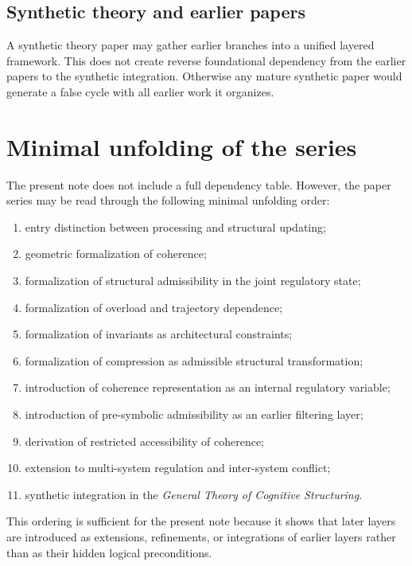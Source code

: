 \documentclass[11pt,a4paper]{article}
\begin{document}
	\subsection{Synthetic theory and earlier papers}
	
	A synthetic theory paper may gather earlier branches into a unified layered framework. This does
	not create reverse foundational dependency from the earlier papers to the synthetic integration.
	Otherwise any mature synthetic paper would generate a false cycle with all earlier work it organizes.
	
	\section{Minimal unfolding of the series}
	
	The present note does not include a full dependency table. However, the paper series may be read
	through the following minimal unfolding order:
	
	\begin{enumerate}[leftmargin=2em]
		\item entry distinction between processing and structural updating;
		\item geometric formalization of coherence;
		\item formalization of structural admissibility in the joint regulatory state;
		\item formalization of overload and trajectory dependence;
		\item formalization of invariants as architectural constraints;
		\item formalization of compression as admissible structural transformation;
		\item introduction of coherence representation as an internal regulatory variable;
		\item introduction of pre-symbolic admissibility as an earlier filtering layer;
		\item derivation of restricted accessibility of coherence;
		\item extension to multi-system regulation and inter-system conflict;
		\item synthetic integration in the \emph{General Theory of Cognitive Structuring}.
	\end{enumerate}
	
	This ordering is sufficient for the present note because it shows that later layers are introduced
	as extensions, refinements, or integrations of earlier layers rather than as their hidden logical
	preconditions.
	
\end{document}
